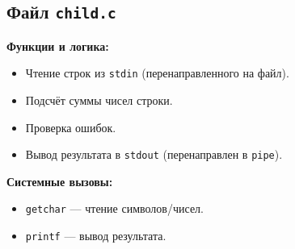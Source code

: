 \subsection*{Файл \texttt{child.c}}
\textbf{Функции и логика:}
\begin{itemize}
    \item Чтение строк из \texttt{stdin} (перенаправленного на файл).
    \item Подсчёт суммы чисел строки.
    \item Проверка ошибок.
    \item Вывод результата в \texttt{stdout} (перенаправлен в \texttt{pipe}).
\end{itemize}

\textbf{Системные вызовы:}
\begin{itemize}
    \item \texttt{getchar} — чтение символов/чисел.
    \item \texttt{printf} — вывод результата.
\end{itemize}
